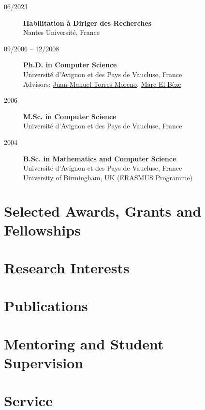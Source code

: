 \documentclass[11pt,a4paper]{article}
\begin{document}
\begin{description}

    \item[06/2023] \textbf{Habilitation à Diriger des Recherches} \\
                    Nantes Université, France

    \item[09/2006 -- 12/2008] \textbf{Ph.D. in Computer Science} \\
                                Université d'Avignon et des Pays de Vaucluse, France \\
                                Advisors: 
                                \href{http://lia.univ-avignon.fr/chercheurs/torres/}{Juan-Manuel Torres-Moreno},
                                \href{http://lia.univ-avignon.fr/user/48}{Marc El-Bèze}
                                
    \item[2006] \textbf{M.Sc. in Computer Science} \\
                Université d'Avignon et des Pays de Vaucluse, France

    \item[2004] \textbf{B.Sc. in Mathematics and Computer Science} \\
                Université d'Avignon et des Pays de Vaucluse, France \\
                University of Birmingham, UK (ERASMUS Programme)
    
\end{description}

\section*{Selected Awards, Grants and Fellowships}


\section{Research Interests}


\section{Publications}


\section*{Mentoring and Student Supervision}


\section*{Service}

\end{document}
